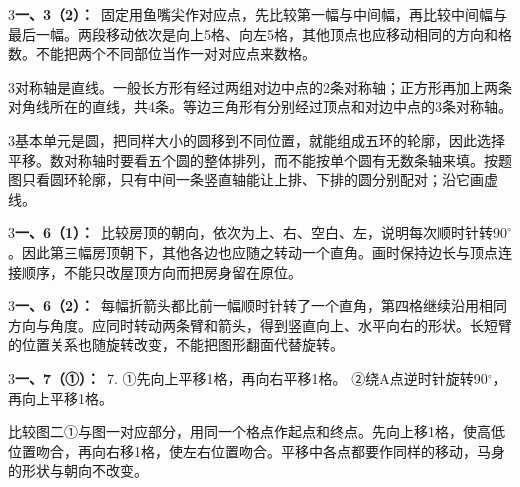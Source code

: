\documentclass[multi=snippet,border={5bp 20bp 5bp 5bp}]{standalone}
\newenvironment{snippet}[3]{\begin{minipage}{#1bp}\color{answerred}\fontsize{#2}{#3}\selectfont\raggedright}{\end{minipage}}
\begin{document}
\begin{snippet}{505}{11.5}{14}\begin{multicols}{3}\raggedcolumns \textbf{一、3（2）：}\ 固定用鱼嘴尖作对应点，先比较第一幅与中间幅，再比较中间幅与最后一幅。两段移动依次是向上5格、向左5格，其他顶点也应移动相同的方向和格数。不能把两个不同部位当作一对对应点来数格。\end{multicols}\end{snippet}
\begin{snippet}{505}{11.5}{14}\begin{multicols}{3}\raggedcolumns 对称轴是直线。一般长方形有经过两组对边中点的2条对称轴；正方形再加上两条对角线所在的直线，共4条。等边三角形有分别经过顶点和对边中点的3条对称轴。\end{multicols}\end{snippet}
\begin{snippet}{505}{11.5}{14}\begin{multicols}{3}\raggedcolumns 基本单元是圆，把同样大小的圆移到不同位置，就能组成五环的轮廓，因此选择平移。数对称轴时要看五个圆的整体排列，而不能按单个圆有无数条轴来填。按题图只看圆环轮廓，只有中间一条竖直轴能让上排、下排的圆分别配对；沿它画虚线。\end{multicols}\end{snippet}
\begin{snippet}{505}{11.5}{14}\begin{multicols}{3}\raggedcolumns \textbf{一、6（1）：}\ 比较房顶的朝向，依次为上、右、空白、左，说明每次顺时针转\(90^\circ\)\allowbreak 。因此第三幅房顶朝下，其他各边也应随之转动一个直角。画时保持边长与顶点连接顺序，不能只改屋顶方向而把房身留在原位。\end{multicols}\end{snippet}
\begin{snippet}{505}{11.5}{14}\begin{multicols}{3}\raggedcolumns \textbf{一、6（2）：}\ 每幅折箭头都比前一幅顺时针转了一个直角，第四格继续沿用相同方向与角度。应同时转动两条臂和箭头，得到竖直向上、水平向右的形状。长短臂的位置关系也随旋转改变，不能把图形翻面代替旋转。\end{multicols}\end{snippet}
\begin{snippet}{505}{11.5}{14}\begin{multicols}{3}\raggedcolumns \textbf{一、7（①）：}\ 7. ①先向上平移1格，再向右平移1格。 ②绕A点逆时针旋转90\ensuremath{^\circ}，再向上平移1格。\par 比较图二①与图一对应部分，用同一个格点作起点和终点。先向上移1格，使高低位置吻合，再向右移1格，使左右位置吻合。平移中各点都要作同样的移动，马身的形状与朝向不改变。\end{multicols}\end{snippet}
\end{document}
